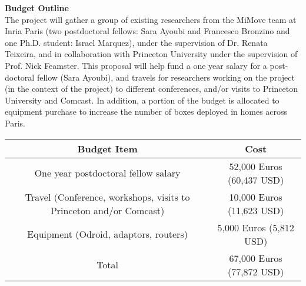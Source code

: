 \documentclass[11 pt]{article}
\begin{document}

\noindent \textbf{Budget Outline}\\

The project will gather a group of existing researchers from the MiMove team at Inria Paris (two postdoctoral fellows: Sara Ayoubi and Francesco Bronzino and one Ph.D. student: Israel Marquez), under the supervision of Dr. Renata Teixeira, and in collaboration with Princeton University under the supervision of Prof. Nick Feamster. This proposal will help fund a one year salary for a post-doctoral fellow (Sara Ayoubi), and travels for researchers working on the project (in the context of the project) to different conferences, and/or visits to Princeton University and Comcast. In addition, a portion of the budget is allocated to equipment purchase to increase the number of boxes deployed in homes across Paris.\\

\begin{center}
 \begin{tabular}{||c c ||}
 \hline
 Budget Item & Cost \\ [0.5ex]
 \hline\hline
 One year postdoctoral fellow salary &  52,000 Euros (60,437 USD)\\
 \hline
 Travel (Conference, workshops, visits to Princeton and/or Comcast) & 10,000 Euros (11,623 USD)\\
 \hline
 Equipment (Odroid, adaptors, routers) & 5,000 Euros (5,812 USD)\\
 \hline
 Total & 67,000 Euros (77,872 USD)\\
 \hline
\end{tabular}
\end{center}
\end{document}
